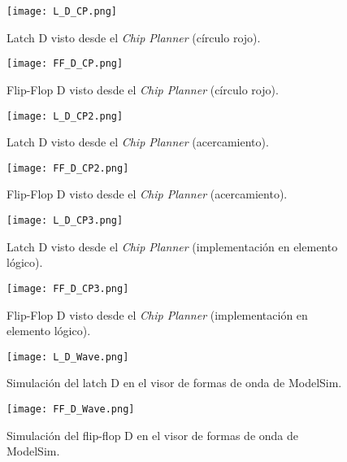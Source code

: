 \begin{figure}[ht]
	\centering
	\texttt{[image: L\_D\_CP.png]}
	\caption{Latch D visto desde el \textit{Chip Planner} (círculo rojo). \label{fig:L_D_CP}}
\end{figure}

\begin{figure}[ht]
	\centering
	\texttt{[image: FF\_D\_CP.png]}
	\caption{Flip-Flop D visto desde el \textit{Chip Planner} (círculo rojo). \label{fig:FF_D_CP}}
\end{figure}

\begin{figure}[ht]
	\centering
	\texttt{[image: L\_D\_CP2.png]}
	\caption{Latch D visto desde el \textit{Chip Planner} (acercamiento). \label{fig:L_D_CP2}}
\end{figure}

\begin{figure}[ht]
	\centering
	\texttt{[image: FF\_D\_CP2.png]}
	\caption{Flip-Flop D visto desde el \textit{Chip Planner} (acercamiento). \label{fig:FF_D_CP2}}
\end{figure}

\begin{figure}[ht]
	\centering
	\texttt{[image: L\_D\_CP3.png]}
	\caption{Latch D visto desde el \textit{Chip Planner} (implementación en elemento lógico). \label{fig:L_D_CP3}}
\end{figure}

\begin{figure}[ht]
	\centering
	\texttt{[image: FF\_D\_CP3.png]}
	\caption{Flip-Flop D visto desde el \textit{Chip Planner} (implementación en elemento lógico). \label{fig:FF_D_CP3}}
\end{figure}

\begin{figure}[ht]
	\centering
	\texttt{[image: L\_D\_Wave.png]}
	\caption{Simulación del latch D en el visor de formas de onda de ModelSim. \label{fig:L_D_Wave}}
\end{figure}

\begin{figure}[ht]
	\centering
	\texttt{[image: FF\_D\_Wave.png]}
	\caption{Simulación del flip-flop D en el visor de formas de onda de ModelSim. \label{fig:FF_D_Wave}}
\end{figure}